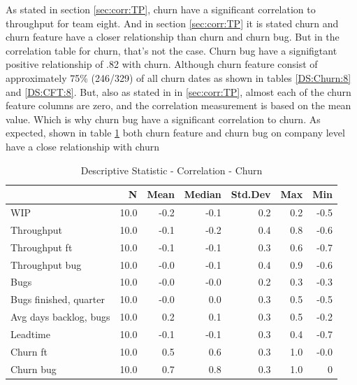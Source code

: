 \documentclass[UKenglish]{ifimaster}  %
\begin{document}
As stated in section \ref{sec:corr:TP}, churn have a significant correlation to throughput for team eight. And in section \ref{sec:corr:TP} it is stated churn and churn feature have a closer relationship than churn and churn bug. But in the correlation table for churn, that's not the case. Churn bug have a signifigtant positive relationship of .82 with churn. Although churn feature consist of approximately 75\% (246/329) of all churn dates as shown in tables \ref{DS:Churn:8} and \ref{DS:CFT:8}. But, also as stated in in \ref{sec:corr:TP}, almost each of the churn feature columns are zero, and the correlation measurement is based on the mean value. Which is why churn bug have a significant correlation to churn. As expected, shown in table \ref{DS:corr:Churn} both churn feature and churn bug on company level have a close relationship with churn
\begin{table}[!htbp]
 \centering
 \begin{tabular}{ | l | r | r | r | r | r | r | }
 \hline
& N & Mean & Median & Std.Dev & Max & Min \\ \hline
WIP  & 10.0 & -0.2 & -0.1 & 0.2 & 0.2 & -0.5\\ \hline
Throughput  & 10.0 & -0.1 & -0.2 & 0.4 & 0.8 & -0.6\\ \hline
Throughput ft  & 10.0 & -0.1 & -0.1 & 0.3 & 0.6 & -0.7\\ \hline
Throughput bug  & 10.0 & -0.0 & -0.1 & 0.4 & 0.9 & -0.6\\ \hline
Bugs  & 10.0 & -0.0 & -0.0 & 0.2 & 0.3 & -0.3\\ \hline
Bugs finished, quarter  & 10.0 & -0.0 & 0.0 & 0.3 & 0.5 & -0.5\\ \hline
Avg days backlog, bugs  & 10.0 & 0.2 & 0.1 & 0.3 & 0.5 & -0.2\\ \hline
Leadtime  & 10.0 & -0.1 & -0.1 & 0.3 & 0.4 & -0.7\\ \hline
Churn ft  & 10.0 & 0.5 & 0.6 & 0.3 & 1.0 & -0.0\\ \hline
Churn bug  & 10.0 & 0.7 & 0.8 & 0.3 & 1.0 & 0\\ \hline
\end{tabular}
 \caption{Descriptive Statistic - Correlation - Churn}
 \label{DS:corr:Churn}
 \end{table}
 
\end{document}
